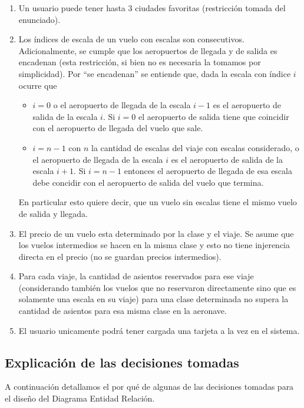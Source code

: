 \begin{enumerate}
	\item Un usuario puede tener hasta 3 ciudades favoritas (restricci\'on tomada del enunciado).
	\item Los \'indices de escala de un vuelo con escalas son consecutivos. Adicionalmente, se cumple
	que los aeropuertos de llegada y de salida es encadenan (esta restricci\'on, si bien no es necesaria
	la tomamos por simplicidad). Por ``se encadenan'' se entiende que, dada la escala con \'indice $i$
	ocurre que
	
	\begin{itemize}
		\item $i = 0$ o el aeropuerto de llegada de la escala $i-1$ es el aeropuerto de salida de
		la escala $i$. Si $i = 0$ el aeropuerto de salida tiene que coincidir con el aeropuerto de llegada
		del vuelo que sale.
		\item $i = n-1$ con $n$ la cantidad de escalas del viaje con escalas considerado, o el aeropuerto
		de llegada de la escala $i$ es el aeropuerto de salida de la escala $i+1$. Si $i = n-1$ entonces
		el aeropuerto de llegada de esa escala debe concidir con el aeropuerto de salida del vuelo que termina.
	\end{itemize}

	En particular esto quiere decir, que un vuelo sin escalas tiene el mismo vuelo de salida y llegada.
	
	\item El precio de un vuelo esta determinado por la clase y el viaje. Se asume que los vuelos
	intermedios se hacen en la misma clase y esto no tiene injerencia directa en el precio (no se guardan precios intermedios).
	\item Para cada viaje, la cantidad de asientos reservados para ese viaje (considerando tambi\'en los vuelos
	que no reservaron directamente sino que es solamente una escala en su viaje) para una clase determinada no supera la
	cantidad de asientos para esa misma clase en la aeronave.
    \item El usuario unicamente podr\'a tener cargada una tarjeta a la vez en el sistema.
\end{enumerate}

\subsection{Explicaci\'on de las decisiones tomadas}

A continuaci\'on detallamos el por qu\'e de algunas de las decisiones tomadas para el diseño del Diagrama Entidad Relaci\'on.

